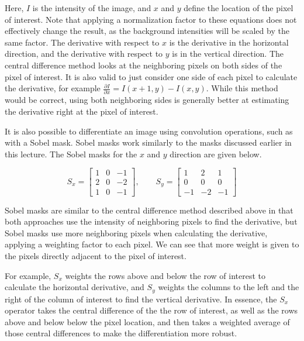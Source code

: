 \documentclass[twoside]{article}
\begin{document}
Here, $I$ is the intensity of the image, and $x$ and $y$ define the location of the pixel of interest. Note that applying a normalization factor to these equations does not effectively change the result, as the background intensities will be scaled by the same factor. The derivative with respect to $x$ is the derivative in the horizontal direction, and the derivative with respect to $y$ is in the vertical direction. The central difference method looks at the neighboring pixels on both sides of the pixel of interest. It is also valid to just consider one side of each pixel to calculate the derivative, for example $\frac{\partial I}{\partial x} = I(x+1,y) - I(x,y)$. While this method would be correct, using both neighboring sides is generally better at estimating the derivative right at the pixel of interest.

It is also possible to differentiate an image using convolution operations, such as with a Sobel mask.  Sobel masks work similarly to the masks discussed earlier in this lecture. The Sobel masks for the $x$ and $y$ direction are given below.

\[
S_x =
\begin{bmatrix}
1 & 0 & -1\\
2 & 0 & -2\\
1 & 0 & -1
\end{bmatrix}
, \qquad S_y =
\begin{bmatrix}
1 & 2 & 1\\
0 & 0 & 0\\
-1 & -2 & -1
\end{bmatrix}
\]

Sobel masks are similar to the central difference method described above in that both approaches use the intensity of neighboring pixels to find the derivative, but Sobel masks use more neighboring pixels when calculating the derivative, applying a weighting factor to each pixel. We can see that more weight is given to the pixels directly adjacent to the pixel of interest.

For example, $S_x$ weights the rows above and below the row of interest to calculate the horizontal derivative, and $S_y$ weights the columns to the left and the right of the column of interest to find the vertical derivative. In essence, the $S_x$ operator takes the central difference of the the row of interest, as well as the rows above and below below the pixel location, and then takes a weighted average of those central differences to make the differentiation more robust.
\end{document}
